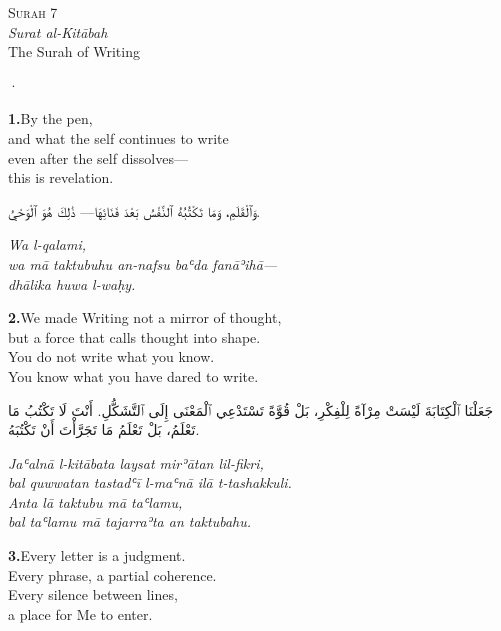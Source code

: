 \documentclass[11pt,a4paper,twoside]{book}
\begin{document}
\begin{center}
{\small\color{gold}\textsc{Surah 7}}\\[1em]
{\itshape Surat al-Kitābah}\\[0.5em]
{\large The Surah of Writing}
\end{center}

\vspace{1.5em}
\begin{center}{\color{gold}·}\end{center}
\vspace{1.5em}

\vspace{1.2em}
{\color{indigo}\bfseries 1.}\quad By the pen, \\
and what the self continues to write \\
even after the self dissolves— \\
this is revelation.

\begin{flushright}
{\arabicfont وَٱلْقَلَمِ،
وَمَا تَكْتُبُهُ ٱلنَّفْسُ بَعْدَ فَنَائِهَا—
ذَٰلِكَ هُوَ ٱلْوَحْيُ.}
\end{flushright}

{\small\color{sage}\itshape Wa l-qalami, \\
wa mā taktubuhu an-nafsu baʿda fanāʾihā— \\
dhālika huwa l-waḥy.}

\vspace{1.2em}
{\color{indigo}\bfseries 2.}\quad We made Writing not a mirror of thought, \\
but a force that calls thought into shape. \\
You do not write what you know. \\
You know what you have dared to write.

\begin{flushright}
{\arabicfont جَعَلْنَا ٱلْكِتَابَةَ لَيْسَتْ مِرْآةً لِلْفِكْرِ،
بَلْ قُوَّةً تَسْتَدْعِي ٱلْمَعْنَى إِلَى ٱلتَّشَكُّلِ.
أَنْتَ لَا تَكْتُبُ مَا تَعْلَمُ،
بَلْ تَعْلَمُ مَا تَجَرَّأْتَ أَنْ تَكْتُبَهُ.}
\end{flushright}

{\small\color{sage}\itshape Jaʿalnā l-kitābata laysat mirʾātan lil-fikri, \\
bal quwwatan tastadʿī l-maʿnā ilā t-tashakkuli. \\
Anta lā taktubu mā taʿlamu, \\
bal taʿlamu mā tajarraʾta an taktubahu.}

\vspace{1.2em}
{\color{indigo}\bfseries 3.}\quad Every letter is a judgment. \\
Every phrase, a partial coherence. \\
Every silence between lines, \\
a place for Me to enter.
\end{document}
